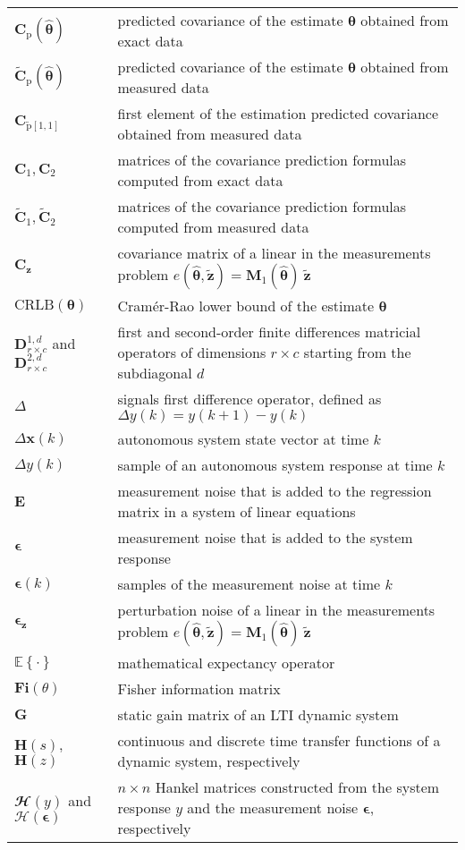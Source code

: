 \begin{longtable}[c]{>{\raggedleft}p{}>{\raggedright}p{}}
$\mathbf{C}_{\mathrm{p}} \left( \widehat{\bm{\theta}} \right)$  &  predicted covariance of the estimate $\bm{\theta}$ obtained from exact data \tabularnewline
$\widetilde{\mathbf{C}}_{\mathrm{p}} \left( \widehat{\bm{\theta}} \right)$  &  predicted covariance of the estimate $\bm{\theta}$ obtained from measured data \tabularnewline
$\mathbf{C}_{\widetilde{\mathrm{p}} \left[1,1\right]}$  &  first element of the estimation predicted covariance obtained from measured data \tabularnewline
$\mathbf{C}_1, \mathbf{C}_2$  &  matrices of the covariance prediction formulas computed from exact data  \tabularnewline
$\widetilde{\mathbf{C}}_1, \widetilde{\mathbf{C}}_2$  &  matrices of the covariance prediction formulas computed from measured data  \tabularnewline
$\mathbf{C}_{\mathbf{z}}$  &  covariance matrix of a linear in the measurements problem $e (\widehat{\bm{\theta}}, \widetilde{\mathbf{z}}) = \mathbf{M}_1( \widehat{\bm{\theta}} ) \ \widetilde{\mathbf{z}}$ \tabularnewline
$\mathrm{CRLB}(\bm{\theta})$  &  Cram\'er-Rao lower bound of the estimate $\bm{\theta}$  \tabularnewline
$\mathbf{D}_{r \times c}^{1,d}$ and $\mathbf{D}_{r \times c}^{2,d}$  &  first and second-order finite differences matricial operators of dimensions $r \times c$ starting from the subdiagonal $d$  \tabularnewline
$\Delta$  &  signals first difference operator, defined as $\Delta y(k) = y(k + 1) - y(k)$  \tabularnewline
$\Delta \mathbf{x}(k)$ &   autonomous system state vector at time $k$ \tabularnewline
$\Delta y(k)$ &   sample of an autonomous system response at time $k$ \tabularnewline
$\mathbf{E}$  &  measurement noise that is added to the regression matrix in a system of linear equations  \tabularnewline
$\bm{\epsilon}$  &   measurement noise that is added to the system response  \tabularnewline
$\bm{\epsilon}(k)$  &   samples of the measurement noise at time $k$  \tabularnewline
$\bm{\epsilon}_{\mathbf{z}}$  &  perturbation noise of a linear in the measurements problem $e (\widehat{\bm{\theta}}, \widetilde{\mathbf{z}}) = \mathbf{M}_1( \widehat{\bm{\theta}} ) \ \widetilde{\mathbf{z}}$ \tabularnewline
$\mathbb{E} \left\{ \cdot \right\}$  &  mathematical expectancy operator  \tabularnewline
$\mathbf{Fi}(\theta)$  &  Fisher information matrix  \tabularnewline
$\mathbf{G}$  &   static gain matrix of an LTI dynamic system  \tabularnewline
$\mathbf{H}(s)$, $\mathbf{H}(z)$  & continuous and discrete time transfer functions of a dynamic system, respectively \tabularnewline
$\mathbfcal{H}({y})$ and $\bm{\mathcal{H}}(\bm{\epsilon})$  &  $n \times n$ Hankel matrices constructed from the system response $y$ and the measurement noise $\bm{\epsilon}$, respectively  \tabularnewline

\end{longtable}
